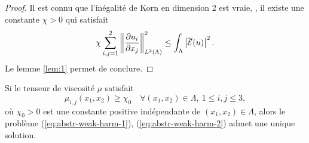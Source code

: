 \begin{proof}
Il est connu que l'inégalité de Korn en dimension 2 est vraie, \ie, il
existe une constante $\chi > 0$ qui satisfait
\begin{equation}
\chi\sum_{i,j = 1}^2 \left\lVert \frac{\partial u_i}{\partial
    x_j} \right\rVert^2_{L^2(\Lambda)} \leq \int_\Lambda \left\lvert \overline{\mathcal E}(u) \right\rvert^2.
\end{equation}
Le lemme \ref{lem:1} permet de conclure.
\end{proof}

\begin{proposition}\label{prop:2}
  Si le tenseur de viscosité $\mu$ satisfait
\begin{equation}
  \mu_{i,j}(x_1,x_2) \geq \chi_0\quad \forall (x_1, x_2)\in \Lambda,\ 1
  \leq i,j \leq 3,\label{eq:hypothesis}
\end{equation}
où $\chi_0 > 0$ est une constante positive indépendante de $(x_1,
x_2)\in \Lambda$, alors le problème (\ref{eq:abstr-weak-harm-1}),
(\ref{eq:abstr-weak-harm-2}) admet une unique solution.
\end{proposition}

